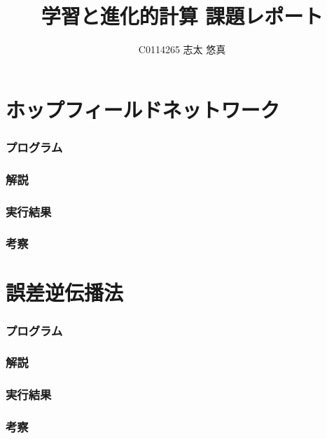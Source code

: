 \documentclass{jsarticle}
\title{学習と進化的計算 課題レポート}
\author{C0114265 志太 悠真}
\begin{document}
\maketitle

\tableofcontents

\part{ホップフィールドネットワーク}
\section{プログラム}


\section{解説}


\section{実行結果}


\section{考察}


\part{誤差逆伝播法}
\section{プログラム}


\section{解説}


\section{実行結果}


\section{考察}
\end{document}
